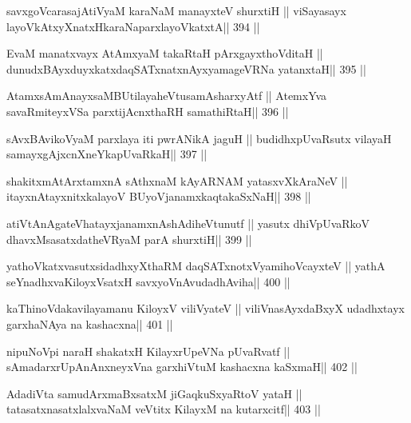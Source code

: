 \begin{shl}
savxgoVcarasajAtiVyaM karaNaM manayxteV shurxtiH ||
viSayasayx layoVkAtxyX\s natxHkaraNaparxlayoVkatxtA\hfill || 394 ||
\end{shl}

\begin{shl}
EvaM manatxvayx AtAmx\s yaM takaRtaH pArxgayxthoVditaH ||
dunudxBAyxduyxkatxdaqSATxnatxnAyxyamageVRNa yatanxtaH\hfill || 395 ||
\end{shl}

\begin{shl}
AtamxsAmAnayxsaMBUtilayaheVtusamAsharxyAtf ||
AtemxYva savaRmiteyxVSa parxtijAcnxthaRH samathiRtaH\hfill || 396 ||
\end{shl}

\begin{shl}
sAvxBAvikoV\s yaM parxlaya iti pwrANikA jaguH ||
budidhxpUvaRsutx vilayaH samayxgAjxcnXneYkapUvaRkaH\hfill || 397 ||
\end{shl}

\begin{shl}
shakitxmAtArxtamxnA sAthxnaM kAyARNAM yatasxvXkAraNeV ||
itayxnAtayxnitxkalayoV BUyoVjanamxkaqtakaSxNaH\hfill || 398 ||
\end{shl}

\begin{shl}
atiVtAnAgateVhatayxjanamxnAshAdiheVtunutf ||
yasutx dhiVpUvaRkoV dhavxMsasatxdatheVRyaM parA shurxtiH\hfill || 399 ||
\end{shl}

\begin{shl}
yathoVkatxvasutxsidadhxyXthaRM daqSATxnotxV\s yamihoVcayxteV ||
yathA seYnadhxvaKiloyxV\s satxH savxyoVnAvudadhAviha\hfill || 400 ||
\end{shl}

\begin{shl}
kaThinoVdakavilayamanu KiloyxV viliVyateV ||
viliVnasAyxdaBxyX udadhxtayx garxhaNAya na kashacxna\hfill || 401 ||
\end{shl}

\begin{shl}
nipuNoV\s pi naraH shakatxH KilayxrUpeVNa pUvaRvatf ||
sAmadarxrUpAnAnxneyxVna garxhiVtuM kashacxna kaSxmaH\hfill || 402 ||
\end{shl}

\begin{shl}
AdadiVta samudArxmaBxsatxM jiGaqkuSxyaRtoV yataH ||
tatasatxnasatxlalxvaNaM veVtitx KilayxM na kutarxcitf\hfill || 403 ||
\end{shl}

